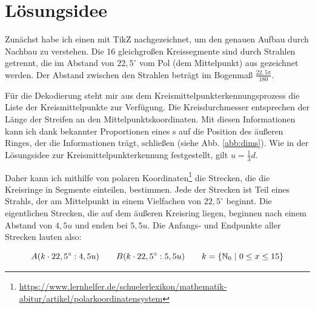 \section{Lösungsidee}
	\begin{figure}
		\setlength\intextsep{0pt}
		\centering
		
		\caption{}
		\label{abb:spidergrafik}
		\vspace{-20pt}
	\end{figure}
Zunächst habe ich einen \task{} mit TikZ nachgezeichnet, um den genauen Aufbau durch Nachbau zu verstehen. Die 16 gleichgroßen Kreissegmente sind durch Strahlen getrennt, die im Abstand von \(22,5^{\circ}\) vom Pol (dem Mittelpunkt) aus gezeichnet werden. Der Abstand zwischen den Strahlen beträgt im Bogenmaß \(\frac{22,5\pi}{180}\).

Für die Dekodierung steht mir aus dem Kreismittelpunkterkennungsprozess die Liste der Kreismittelpunkte zur Verfügung. Die Kreisdurchmesser entsprechen der Länge der Streifen an den Mittelpunktskoordinaten. Mit diesen Informationen kann ich dank bekannter Proportionen eines \task{}s auf die Position des äußeren Ringes, der die Informationen trägt, schließen (siehe Abb. \ref{abb:dims}). Wie in der Lösungsidee zur Kreismittelpunkterkennung festgestellt, gilt \(u=\frac{1}{3}d\).

\begin{figure}
	\setlength\intextsep{0pt}
	\centering	
	
	\caption{}
	\label{abb:trigon}
\end{figure}
Daher kann ich mithilfe von polaren Koordinaten\footnote{\url{https://www.lernhelfer.de/schuelerlexikon/mathematik-abitur/artikel/polarkoordinatensystem}} die Strecken, die die Kreisringe in Segmente einteilen, bestimmen. Jede der Strecken ist Teil eines Strahls, der am Mittelpunkt in einem Vielfachen von \(22,5^{\circ}\) beginnt. Die eigentlichen Strecken, die auf dem äußeren Kreisring liegen, beginnen nach einem Abstand von \(4,5u\) und enden bei \(5,5u\). Die Anfangs- und Endpunkte aller Strecken lauten also:

\begin{equation}
A(k \cdot 22,5^{\circ}:4,5u) \hspace{2em} B(k \cdot 22,5^{\circ}:5,5u) \hspace{2em} k = \{\mathbb{N}_0 \hspace{0.3em}|\hspace{0.3em} 0 \le x \le 15\}
\end{equation}

